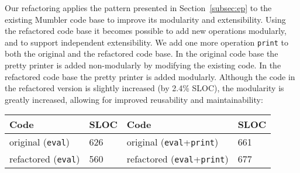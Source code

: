 Our refactoring applies the pattern presented in
Section~\ref{subsec:ep} to the existing Mumbler code base to improve
its modularity and extensibility. Using the refactored code base it
becomes possible to add new operations modularly, and to support
independent extensibility. We add one more
operation \texttt{print} to both the original and the refactored code
base. In the original code base the pretty printer is added
non-modularly by modifying the existing code. In the refactored code
base the pretty printer is added modularly. 
Although the code in the refactored version is slightly increased (by 2.4\% SLOC), the
modularity is greatly increased, allowing for improved reusability and maintainability:

\vspace{0.5em}
{\fontsize{8}{10}\selectfont
\begin{tabular}{llll}
\hline
\rowcolor[HTML]{C0C0C0} 
Code               & SLOC & Code               & SLOC \\ \hline
original (\texttt{eval})         & 626  & original (\texttt{eval}+\texttt{print}) & 661  \\ 
refactored (\texttt{eval})         & 560  & refactored (\texttt{eval}+\texttt{print}) & 677  \\ \hline
\end{tabular}
}


